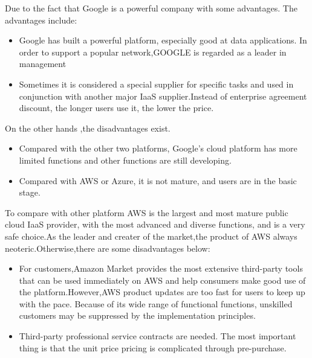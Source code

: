 \documentclass{article}
\begin{document}
Due to the fact that Google is a powerful company with some advantages. The advantages include:
\begin{itemize}
    \item  Google has built a powerful platform, especially good at data applications. In order to support a popular network,GOOGLE is regarded as a leader in management
    \item  Sometimes it is considered a special supplier for specific tasks and used in conjunction with another major IaaS supplier.Instead of enterprise agreement discount, the longer users use it, the lower the price.
\end{itemize}
On the other hands ,the disadvantages exist.
\begin{itemize}
    \item Compared with the other two platforms, Google's cloud platform has more limited functions and other functions are still developing. 
    \item Compared with AWS or Azure, it is not mature, and users are in the basic stage.
\end{itemize}

To compare with other platform AWS is the largest and most mature public cloud IaaS provider, with the most advanced and diverse functions, and is a very safe choice.As the leader and creater of the market,the product of AWS always neoteric.Otherwise,there are some disadvantages below:
\begin{itemize}
    \item For customers,Amazon Market provides the most extensive third-party tools that can be used immediately on AWS and help consumers make good use of the platform.However,AWS product updates are too fast for users to keep up with the pace. Because of its wide range of functional functions, unskilled customers may be suppressed by the implementation principles. 
    \item Third-party professional service contracts are needed. The most important thing is that the unit price pricing is complicated through pre-purchase.
    
\end{itemize}
\end{document}
